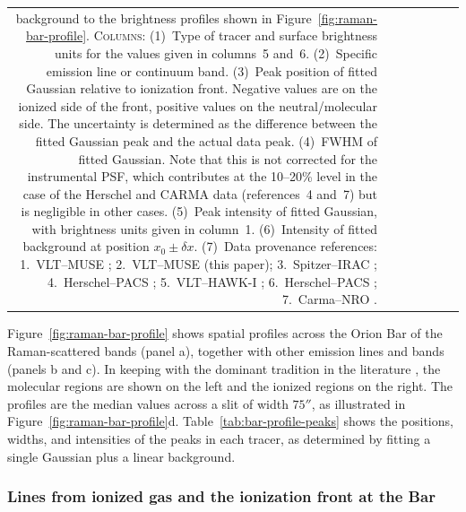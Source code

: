 \documentclass[useAMS, usenatbib, a4paper]{mnras}
\begin{document}
\begin{table}
\begin{tabular}{r r R R R R c }
{    background to the brightness profiles shown in
    Figure~\ref{fig:raman-bar-profile}.
    \textsc{Columns}: (1)~Type of tracer and surface brightness units for the values
    given in columns~5 and~6.
    (2)~Specific emission line or continuum band.
    (3)~Peak position of fitted Gaussian relative to ionization front.
    Negative values are on the ionized side of the front,
    positive values on the neutral/molecular side.
    The uncertainty is determined as the difference between the fitted Gaussian peak
    and the actual data peak.
    (4)~FWHM of fitted Gaussian. Note that this is not corrected for
    the instrumental PSF, which contributes at the 10--20\% level in
    the case of the Herschel and CARMA
    data (references~4 and~7) but is negligible in other cases.
    (5)~Peak intensity of fitted Gaussian, with brightness units given in column~1.
    (6)~Intensity of fitted background at position \(x_0 \pm \delta x\).
    (7)~Data provenance references:
    1.~VLT--MUSE \citep{Weilbacher:2015a};
    2.~VLT--MUSE (this paper);
    3.~Spitzer--IRAC \citep{Megeath:2012a};
    4.~Herschel--PACS \citep{Bernard-Salas:2012a};
    5.~VLT--HAWK-I \citep{Kissler-Patig:2008a};
    6.~Herschel--PACS \citep{Parikka:2018a};
    7.~Carma--NRO \citep{Kong:2018a}.
    }
  \end{tabular}
\end{table}


Figure~\ref{fig:raman-bar-profile} shows spatial profiles across the
Orion Bar of the Raman-scattered bands (panel a), together with other
emission lines and bands (panels b and c). In keeping with the
dominant tradition in the literature \citetext{e.g., Fig.~9 of
  \citealp{van-der-Werf:1996a}, Fig.~2 of \citealp{Goicoechea:2017a}},
the molecular regions are shown on the left and the ionized regions on
the right.  The profiles are the median values across a slit of width
\(75''\), as illustrated in Figure~\ref{fig:raman-bar-profile}d.
Table~\ref{tab:bar-profile-peaks} shows the positions, widths, and
intensities of the peaks in each tracer, as determined by fitting a
single Gaussian plus a linear background.

\subsubsection{Lines from ionized gas and the ionization front at the Bar}
\label{sec:lines-from-ionized}
\end{document}
